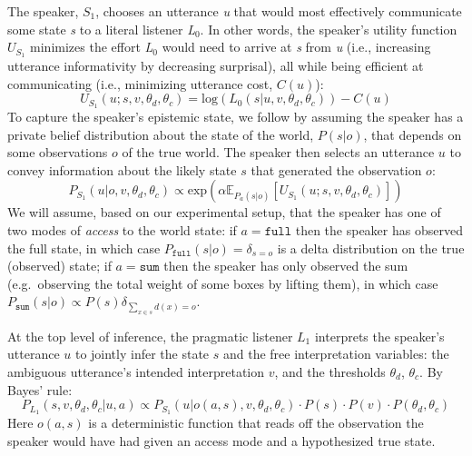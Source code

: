 \documentclass[linguex]{sp}
\begin{document}
The speaker, $S_{1}$, chooses an utterance \emph{u} that would most effectively communicate some state \emph{s} to a literal listener \emph{L}$_{0}$.  In other words, the speaker's utility function $U_{S_{1}}$ minimizes the effort \emph{L}$_{0}$ would need to arrive at \emph{s} from \emph{u} (i.e., increasing utterance informativity by decreasing surprisal), all while being efficient at communicating (i.e., minimizing utterance cost, $C(u)$):
$$U_{S_{1}}(u;s,v,\theta_d,\theta_c) = \textrm{log}(L_{0}(s|u,v,\theta_d,\theta_c)) - C(u)$$
To capture the speaker's epistemic state, we follow \cite{goodmanstuhlmuller2013} by assuming the speaker has a private belief distribution about the state of the world, $P(s|o)$, that depends on some observations $o$ of the true world. 
The speaker then selects an utterance $u$ to convey information about the likely state $s$ that generated the observation $o$:
$$P_{S_{1}} (u|o,v,\theta_d,\theta_c) \propto \textrm{exp}(\alpha \mathbb{E}_{P_a(s|o)}[U_{S_{1}} (u;s,v,\theta_d,\theta_c)])$$
We will assume, based on our experimental setup, that the speaker has one of two modes of \emph{access} to the world state: if $a=\texttt{full}$ then the speaker has observed the full state, in which case $P_{\texttt{full}}(s|o) = \delta_{s=o}$ is a delta distribution on the true (observed) state; if $a=\texttt{sum}$ then the speaker has only observed the sum (e.g.~observing the total weight of some boxes by lifting them), in which case $P_{\texttt{sum}}(s|o)\propto P(s)\delta_{\sum_{x\in s} d(x) = o}$.

%


At the top level of inference, the pragmatic listener $L_{1}$ interprets the speaker's utterance $u$ to jointly infer the state $s$ and
the free interpretation variables: the ambiguous utterance's intended interpretation $v$, and the thresholds $\theta_d$, $\theta_c$. %
By Bayes' rule:
$$P_{L_{1}}(s,v,\theta_d,\theta_c|u,a) \propto P_{S_{1}}(u|o(a,s),v,\theta_d,\theta_c) \cdot P(s) \cdot P(v) \cdot P(\theta_d,\theta_c)$$
Here $o(a,s)$ is a deterministic function that reads off the observation the speaker would have had given an access mode and a hypothesized true state.
\end{document}
